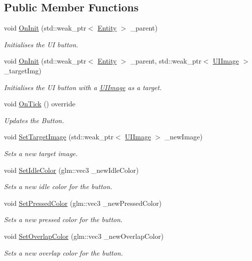 \subsection*{Public Member Functions}
\begin{DoxyCompactItemize}
\item 
void \hyperlink{classfrontier_1_1_u_i_button_a1c4555865094fdd2dd9dd595740c05b0}{On\+Init} (std\+::weak\+\_\+ptr$<$ \hyperlink{classfrontier_1_1_entity}{Entity} $>$ \+\_\+parent)
\begin{DoxyCompactList}\small\item\em Initialises the UI button. \end{DoxyCompactList}\item 
void \hyperlink{classfrontier_1_1_u_i_button_a7b952033156122471f3fd6688961505f}{On\+Init} (std\+::weak\+\_\+ptr$<$ \hyperlink{classfrontier_1_1_entity}{Entity} $>$ \+\_\+parent, std\+::weak\+\_\+ptr$<$ \hyperlink{classfrontier_1_1_u_i_image}{U\+I\+Image} $>$ \+\_\+target\+Img)
\begin{DoxyCompactList}\small\item\em Initialises the UI button with a \hyperlink{classfrontier_1_1_u_i_image}{U\+I\+Image} as a target. \end{DoxyCompactList}\item 
void \hyperlink{classfrontier_1_1_u_i_button_a8eda4323e4d0c2cd2c6a4639f39a1a09}{On\+Tick} () override
\begin{DoxyCompactList}\small\item\em Updates the Button. \end{DoxyCompactList}\item 
void \hyperlink{classfrontier_1_1_u_i_button_acb2814a6d4a6303ad8606f7ae01e3f3d}{Set\+Target\+Image} (std\+::weak\+\_\+ptr$<$ \hyperlink{classfrontier_1_1_u_i_image}{U\+I\+Image} $>$ \+\_\+new\+Image)
\begin{DoxyCompactList}\small\item\em Sets a new target image. \end{DoxyCompactList}\item 
void \hyperlink{classfrontier_1_1_u_i_button_a0eade093232bc80046e2d9df0157e353}{Set\+Idle\+Color} (glm\+::vec3 \+\_\+new\+Idle\+Color)
\begin{DoxyCompactList}\small\item\em Sets a new idle color for the button. \end{DoxyCompactList}\item 
void \hyperlink{classfrontier_1_1_u_i_button_a40ac28d611b1b30112bd8bff47ade5de}{Set\+Pressed\+Color} (glm\+::vec3 \+\_\+new\+Pressed\+Color)
\begin{DoxyCompactList}\small\item\em Sets a new pressed color for the button. \end{DoxyCompactList}\item 
void \hyperlink{classfrontier_1_1_u_i_button_a3a71b90b88606a1eacb79fcb38eba42b}{Set\+Overlap\+Color} (glm\+::vec3 \+\_\+new\+Overlap\+Color)
\begin{DoxyCompactList}\small\item\em Sets a new overlap color for the button. \end{DoxyCompactList}\end{DoxyCompactItemize}
